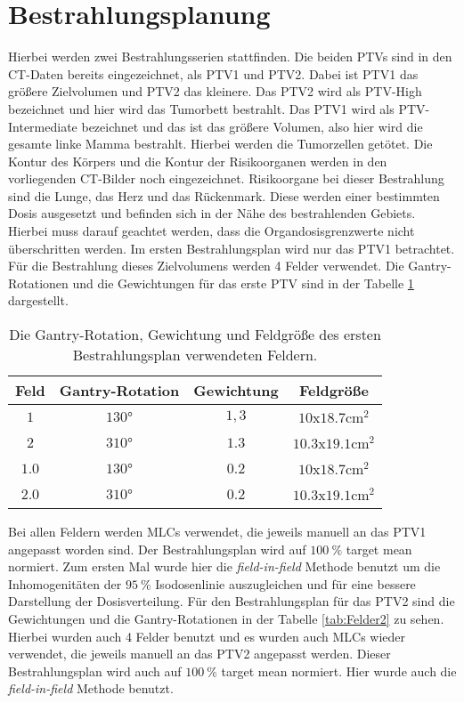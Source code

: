 \section{Bestrahlungsplanung}
\label{sec:Bestrahlungsplanung}
Hierbei werden zwei Bestrahlungsserien stattfinden. Die beiden PTVs sind in den CT-Daten bereits eingezeichnet, als PTV1 und PTV2. Dabei ist PTV1 das größere Zielvolumen und PTV2 das kleinere. Das PTV2 wird als PTV-High bezeichnet und hier wird das Tumorbett bestrahlt. Das PTV1 wird als PTV-Intermediate bezeichnet und das ist das größere Volumen, also hier wird die gesamte linke Mamma bestrahlt. Hierbei werden die Tumorzellen getötet. Die Kontur des Körpers und die Kontur der Risikoorganen werden in den vorliegenden CT-Bilder noch eingezeichnet. Risikoorgane bei dieser Bestrahlung sind die Lunge, das Herz und das Rückenmark. Diese werden einer bestimmten Dosis ausgesetzt und befinden sich in der Nähe des bestrahlenden Gebiets. Hierbei muss darauf geachtet werden, dass die Organdosisgrenzwerte nicht überschritten werden.
Im ersten Bestrahlungsplan wird nur das PTV1 betrachtet. Für die Bestrahlung dieses Zielvolumens werden 4 Felder verwendet. Die Gantry-Rotationen und die Gewichtungen für das erste PTV sind in der Tabelle \ref{tab:Felder1} dargestellt.

\begin{table}
	\centering
	\caption{Die Gantry-Rotation, Gewichtung und Feldgröße des ersten Bestrahlungsplan verwendeten Feldern.}
	\label{tab:Felder1}
	\begin{tabular}{c c c c}
		\toprule
		Feld & Gantry-Rotation & Gewichtung & Feldgröße\\
		\midrule
		$1$ & $130°$   & $1,3$ & $\num{10}$x$\num{18.7} \si{\centi\meter\squared}$ \\
		$2$ & $310°$  & $1.3$ & $\num{10.3}$x$\num{19.1} \si{\centi\meter\squared}$ \\
		$1.0$ & $130°$ & $0.2$ & $\num{10}$x$\num{18.7} \si{\centi\meter\squared}$ \\
		$2.0$ & $310°$ & $0.2$ & $\num{10.3}$x$\num{19.1} \si{\centi\meter\squared}$ \\
		\bottomrule
	\end{tabular}
\end{table}

Bei allen Feldern werden MLCs verwendet, die jeweils manuell an das PTV1 angepasst worden sind. Der Bestrahlungsplan wird auf $\SI{100}{\percent}$ target mean normiert. Zum ersten Mal wurde hier die \textit{field-in-field} Methode benutzt um die Inhomogenitäten der $\SI{95}{\percent}$ Isodosenlinie auszugleichen und für eine bessere Darstellung der Dosisverteilung.
Für den Bestrahlungsplan für das PTV2 sind die Gewichtungen und die Gantry-Rotationen in der Tabelle \ref{tab:Felder2} zu sehen. Hierbei wurden auch 4 Felder benutzt und es wurden auch MLCs wieder verwendet, die jeweils manuell an das PTV2 angepasst werden. Dieser Bestrahlungsplan wird auch auf $\SI{100}{\percent}$ target mean normiert. Hier wurde auch die \textit{field-in-field} Methode benutzt.

